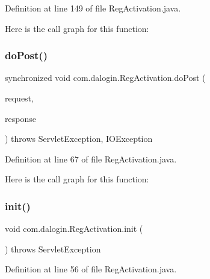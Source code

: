 Definition at line 149 of file Reg\+Activation.\+java.

Here is the call graph for this function\+:
\mbox{\label{classcom_1_1dalogin_1_1_reg_activation_a669791733a98622ae2aa9c241e7e2423}} 
\subsubsection{\texorpdfstring{do\+Post()}{doPost()}}
{\footnotesize\ttfamily synchronized void com.\+dalogin.\+Reg\+Activation.\+do\+Post (\begin{DoxyParamCaption}\item[{Http\+Servlet\+Request}]{request,  }\item[{Http\+Servlet\+Response}]{response }\end{DoxyParamCaption}) throws Servlet\+Exception, I\+O\+Exception}



Definition at line 67 of file Reg\+Activation.\+java.

Here is the call graph for this function\+:
\mbox{\label{classcom_1_1dalogin_1_1_reg_activation_a376fe8d51e3eed6ac4e920e625fefb18}} 
\subsubsection{\texorpdfstring{init()}{init()}}
{\footnotesize\ttfamily void com.\+dalogin.\+Reg\+Activation.\+init (\begin{DoxyParamCaption}{ }\end{DoxyParamCaption}) throws Servlet\+Exception}



Definition at line 56 of file Reg\+Activation.\+java.

\mbox{\label{classcom_1_1dalogin_1_1_reg_activation_a7b492755e9edafd6120693293ef69b61}} 

